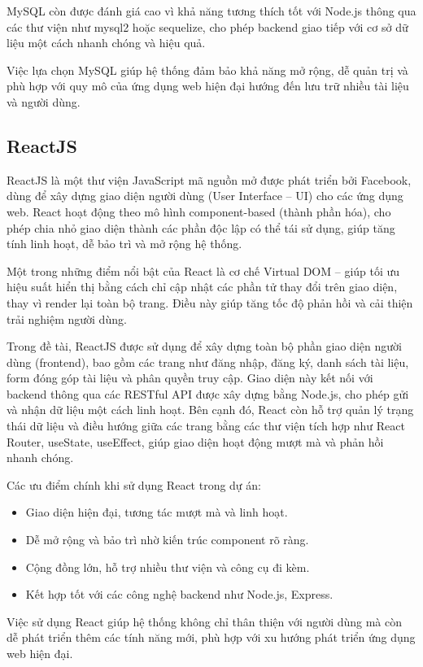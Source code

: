 \documentclass{article}
\begin{document}
	MySQL còn được đánh giá cao vì khả năng tương thích tốt với Node.js thông qua các thư viện như mysql2 hoặc sequelize, cho phép backend giao tiếp với cơ sở dữ liệu một cách nhanh chóng và hiệu quả.
	
	Việc lựa chọn MySQL giúp hệ thống đảm bảo khả năng mở rộng, dễ quản trị và phù hợp với quy mô của ứng dụng web hiện đại hướng đến lưu trữ nhiều tài liệu và người dùng.
	
	\subsection{ReactJS}
	
	ReactJS là một thư viện JavaScript mã nguồn mở được phát triển bởi Facebook, dùng để xây dựng giao diện người dùng (User Interface – UI) cho các ứng dụng web. React hoạt động theo mô hình component-based (thành phần hóa), cho phép chia nhỏ giao diện thành các phần độc lập có thể tái sử dụng, giúp tăng tính linh hoạt, dễ bảo trì và mở rộng hệ thống.
	
	Một trong những điểm nổi bật của React là cơ chế Virtual DOM – giúp tối ưu hiệu suất hiển thị bằng cách chỉ cập nhật các phần tử thay đổi trên giao diện, thay vì render lại toàn bộ trang. Điều này giúp tăng tốc độ phản hồi và cải thiện trải nghiệm người dùng.
	
	Trong đề tài, ReactJS được sử dụng để xây dựng toàn bộ phần giao diện người dùng (frontend), bao gồm các trang như đăng nhập, đăng ký, danh sách tài liệu, form đóng góp tài liệu và phân quyền truy cập. Giao diện này kết nối với backend thông qua các RESTful API được xây dựng bằng Node.js, cho phép gửi và nhận dữ liệu một cách linh hoạt. Bên cạnh đó, React còn hỗ trợ quản lý trạng thái dữ liệu và điều hướng giữa các trang bằng các thư viện tích hợp như React Router, useState, useEffect, giúp giao diện hoạt động mượt mà và phản hồi nhanh chóng.
	
	Các ưu điểm chính khi sử dụng React trong dự án:
	\begin{itemize}
		\item Giao diện hiện đại, tương tác mượt mà và linh hoạt.
		\item Dễ mở rộng và bảo trì nhờ kiến trúc component rõ ràng.
		\item Cộng đồng lớn, hỗ trợ nhiều thư viện và công cụ đi kèm.
		\item Kết hợp tốt với các công nghệ backend như Node.js, Express.
	\end{itemize}
	
	Việc sử dụng React giúp hệ thống không chỉ thân thiện với người dùng mà còn dễ phát triển thêm các tính năng mới, phù hợp với xu hướng phát triển ứng dụng web hiện đại.
	\newpage
\end{document}

